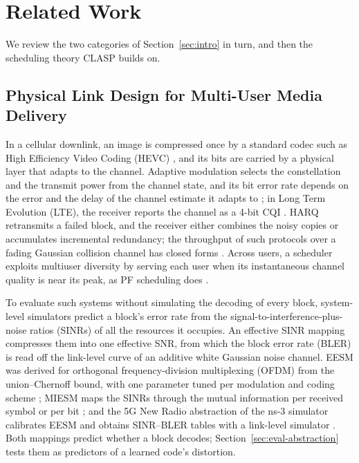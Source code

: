 \section{Related Work}
\label{sec:related}

We review the two categories of Section~\ref{sec:intro} in turn, and then the scheduling theory
CLASP builds on.

\subsection{Physical Link Design for Multi-User Media Delivery}
\label{sec:related-link}

In a cellular downlink, an image is compressed once by a standard codec such as High Efficiency
Video Coding (HEVC) \cite{Sullivan12}, and its bits are carried by a physical layer that adapts to
the channel. Adaptive modulation selects the constellation and the transmit power from the channel state, and
its bit error rate depends on the error and the delay of the channel estimate it adapts to
\cite{Goldsmith97}; in Long Term Evolution (LTE), the receiver reports the channel as a 4-bit CQI
\cite{TS36213}. HARQ retransmits a failed block, and the receiver either combines the noisy copies
\cite{Chase85} or accumulates incremental redundancy; the throughput of such protocols over a
fading Gaussian collision channel has closed forms \cite{Caire01}. Across users, a scheduler
exploits multiuser diversity by serving each user when its instantaneous channel quality is near
its peak, as PF scheduling does \cite{Viswanath02}.

To evaluate such systems without simulating the decoding of every block, system-level simulators
predict a block's
error rate from the signal-to-interference-plus-noise ratios (SINRs) of all the resources it
occupies. An effective SINR mapping compresses them into one effective SNR, from which the block
error rate (BLER) is read off the link-level curve of an additive white Gaussian noise channel.
EESM was derived for orthogonal frequency-division multiplexing (OFDM) from the union--Chernoff
bound, with one parameter tuned per modulation and coding scheme \cite{Ericsson03}; MIESM maps the
SINRs through the mutual information per received symbol or per bit \cite{EMD09}; and the
5G New Radio abstraction of the ns-3 simulator calibrates EESM and obtains SINR--BLER tables with
a link-level simulator \cite{Lagen20}. Both mappings predict whether a block decodes;
Section~\ref{sec:eval-abstraction} tests them as predictors of a learned code's distortion.

